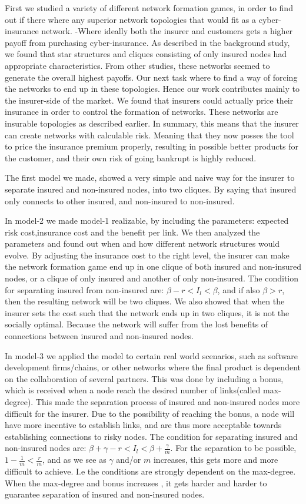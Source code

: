 First we studied a variety of different network formation games, in order to find out if there where any superior network topologies that would fit as a cyber-insurance network. -Where ideally both the insurer and customers gets a higher payoff from purchasing cyber-insurance. As described in the background study, we found that star structures and cliques consisting of only insured nodes had appropriate characteristics.  From other studies, these networks seemed to generate the overall highest payoffs. Our next task where to find a way of forcing the networks to end up in these topologies. Hence our work contributes mainly to the insurer-side of the market. We found that insurers could actually price their insurance in order to control the formation of networks. These networks are insurable topologies as described earlier. In summary, this means that the insurer can create networks with calculable risk. Meaning that they now posses the tool to price the insurance premium properly, resulting in possible better products for the customer, and their own risk of going bankrupt is highly reduced.

The first model we made, showed a very simple and naive way for the insurer to separate insured and non-insured nodes, into two cliques. By saying that insured only connects to other insured, and non-insured to non-insured. 

 In model-2 we made model-1 realizable, by including the parameters: expected risk cost,insurance cost and the benefit per link. We then analyzed the parameters and found out when and how different network structures would evolve. By adjusting the insurance cost to the right level, the insurer can make the network formation game end up in one clique of both insured and non-insured nodes, or a clique of only insured and another of only non-insured. The condition for separating insured from non-insured are: $\beta-r<I_{l}<\beta$, and if also $\beta>r$, then the resulting network will be two cliques.
We also showed that when the insurer sets the cost such that the network ends up in two cliques, it is not the socially optimal. Because the network will suffer from the lost benefits of connections between insured and non-insured nodes. 

In model-3 we applied the model to certain real world scenarios, such as software development firms/chains, or other networks where the final product is dependent on the collaboration of several partners.
This was done by including a bonus, which is received when a node reach the desired number of links(called max-degree). This made the separation process of insured and non-insured nodes more difficult for the insurer. Due to the possibility of reaching the bonus, a node will have more incentive to establish links, and are thus more acceptable towards establishing connections to risky nodes. The condition for separating insured and non-insured nodes are: $\beta+\gamma-r<I_{l}<\beta+\frac{\gamma}{m}$. For the separation to be possible, $1-\frac{1}{m}<\frac{r}{m}$, and as we see as $\gamma$ and/or $m$ increases, this gets more and more difficult to achieve. 
I.e the conditions are strongly dependent on the max-degree. When the max-degree and bonus increases , it gets harder and harder to guarantee separation of insured and non-insured nodes.

